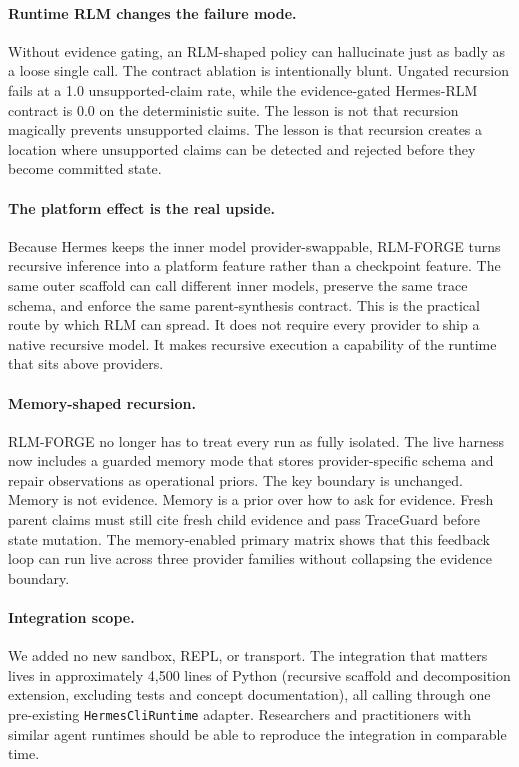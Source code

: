 \documentclass[11pt,a4paper]{article}
\begin{document}
\paragraph{Runtime RLM changes the failure mode.}
Without evidence gating, an RLM-shaped policy can hallucinate just as badly
as a loose single call. The contract ablation is intentionally blunt. Ungated
recursion fails at a 1.0 unsupported-claim rate, while the evidence-gated
Hermes-RLM contract is 0.0 on the deterministic suite. The
lesson is not that recursion magically prevents unsupported claims. The
lesson is that recursion creates a location where unsupported claims can be
detected and rejected before they become committed state.

\paragraph{The platform effect is the real upside.}
Because Hermes keeps the inner model provider-swappable, RLM-FORGE turns
recursive inference into a platform feature rather than a checkpoint feature.
The same outer scaffold can call different inner models, preserve the same
trace schema, and enforce the same parent-synthesis contract. This is the
practical route by which RLM can spread. It does not require every provider to
ship a native recursive model. It makes recursive execution a capability of
the runtime that sits above providers.

\paragraph{Memory-shaped recursion.}
RLM-FORGE no longer has to treat every run as fully isolated. The live
harness now includes a guarded memory mode that stores provider-specific
schema and repair observations as operational priors. The key boundary is
unchanged. Memory is not evidence. Memory is a prior over how to ask for
evidence. Fresh parent claims must still cite fresh child evidence and pass
TraceGuard before state mutation. The memory-enabled primary matrix shows
that this feedback loop can run live across three provider families without
collapsing the evidence boundary.

\paragraph{Integration scope.}
We added no new sandbox, REPL, or transport. The integration that matters
lives in approximately 4{,}500 lines of Python (recursive scaffold and
decomposition extension, excluding tests and concept documentation), all
calling through one pre-existing \texttt{HermesCliRuntime} adapter.
Researchers and practitioners with similar agent runtimes should be able to
reproduce the integration in comparable time.
\end{document}
